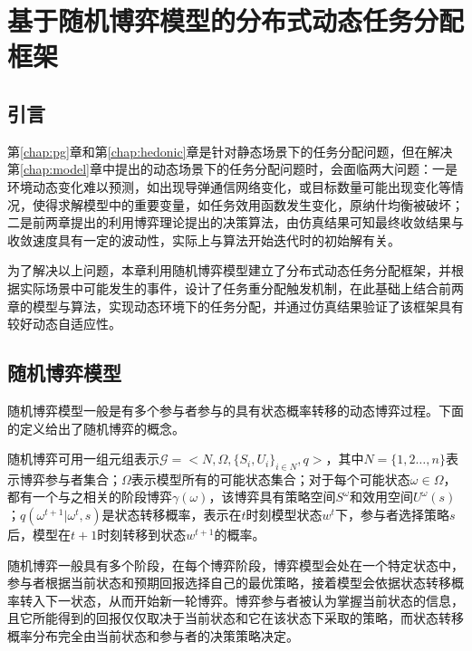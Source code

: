
\chapter{基于随机博弈模型的分布式动态任务分配框架}
\label{chap:stochastic}

\section{引言}
\label{sg:intro}

第\ref{chap:pg}章和第\ref{chap:hedonic}章是针对静态场景下的任务分配问题，但在解决第\ref{chap:model}章中提出的动态场景下的任务分配问题时，会面临两大问题：一是环境动态变化难以预测，如出现导弹通信网络变化，或目标数量可能出现变化等情况，使得求解模型中的重要变量，如任务效用函数发生变化，原纳什均衡被破坏；二是前两章提出的利用博弈理论提出的决策算法，由仿真结果可知最终收敛结果与收敛速度具有一定的波动性，实际上与算法开始迭代时的初始解有关。

为了解决以上问题，本章利用随机博弈模型建立了分布式动态任务分配框架，并根据实际场景中可能发生的事件，设计了任务重分配触发机制，在此基础上结合前两章的模型与算法，实现动态环境下的任务分配，并通过仿真结果验证了该框架具有较好动态自适应性。

\section{随机博弈模型}
\label{sg:stochastic_game}

随机博弈模型一般是有多个参与者参与的具有状态概率转移的动态博弈过程。下面的定义给出了随机博弈的概念。

\begin{definition}[随机博弈]
	随机博弈可用一组元组表示$\mathcal{G}=<N,\Omega,\{S_i,U_i\}_{i\in N},q>$，其中$N=\{1,2\dots,n\}$表示博弈参与者集合；$\Omega$表示模型所有的可能状态集合；对于每个可能状态$\omega \in \Omega$，都有一个与之相关的阶段博弈$\gamma(\omega)$，该博弈具有策略空间$S^\omega$和效用空间$U^\omega(s)$；$q(\omega^{t+1}|\omega^t,s)$是状态转移概率，表示在$t$时刻模型状态$w^t$下，参与者选择策略$s$后，模型在$t+1$时刻转移到状态$w^{t+1}$的概率。
\end{definition}

随机博弈一般具有多个阶段，在每个博弈阶段，博弈模型会处在一个特定状态中，参与者根据当前状态和预期回报选择自己的最优策略，接着模型会依据状态转移概率转入下一状态，从而开始新一轮博弈。博弈参与者被认为掌握当前状态的信息，且它所能得到的回报仅仅取决于当前状态和它在该状态下采取的策略，而状态转移概率分布完全由当前状态和参与者的决策策略决定。



